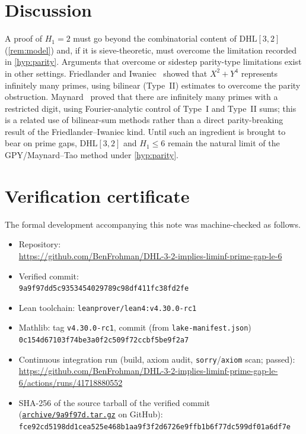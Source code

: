 \documentclass[11pt]{amsart}
\theoremstyle{plain}
\theoremstyle{definition}
\theoremstyle{remark}
\newcommand{\DHL}{\mathrm{DHL}}
\begin{document}
\section{Discussion}\label{sec:discussion}

A proof of $H_1=2$ must go beyond the combinatorial content of $\DHL[3,2]$ (\cref{rem:model}) and, if it is sieve-theoretic, must overcome the limitation recorded in \cref{hyp:parity}. Arguments that overcome or sidestep parity-type limitations exist in other settings. Friedlander and Iwaniec~\cite{FI} showed that $X^2+Y^4$ represents infinitely many primes, using bilinear (Type~II) estimates to overcome the parity obstruction. Maynard~\cite{Maynard19} proved that there are infinitely many primes with a restricted digit, using Fourier-analytic control of Type~I and Type~II sums; this is a related use of bilinear-sum methods rather than a direct parity-breaking result of the Friedlander--Iwaniec kind. Until such an ingredient is brought to bear on prime gaps, $\DHL[3,2]$ and $H_1\le6$ remain the natural limit of the GPY/Maynard--Tao method under \cref{hyp:parity}.


\appendix
\section{Verification certificate}\label{app:cert}

The formal development accompanying this note was machine-checked as follows.

{\raggedright
\begin{itemize}
\item Repository:\\ {\footnotesize\url{https://github.com/BenFrohman/DHL-3-2-implies-liminf-prime-gap-le-6}}
\item Verified commit:\\ {\footnotesize\texttt{9a9f97dd5c9353454029789c98df411fc38fd2fe}}
\item Lean toolchain: \texttt{leanprover/lean4:v4.30.0-rc1}
\item Mathlib: tag \texttt{v4.30.0-rc1}, commit (from \texttt{lake-manifest.json})\\ {\footnotesize\texttt{0c154d67103f74be3a0f2c509f72ccbf5be9f2a7}}
\item Continuous integration run (build, axiom audit, \texttt{sorry}/\texttt{axiom} scan; passed):\\ {\footnotesize\url{https://github.com/BenFrohman/DHL-3-2-implies-liminf-prime-gap-le-6/actions/runs/41718880552}}
\item SHA-256 of the source tarball of the verified commit
(\href{https://github.com/BenFrohman/DHL-3-2-implies-liminf-prime-gap-le-6/archive/9a9f97dd5c9353454029789c98df411fc38fd2fe.tar.gz}{\texttt{archive/9a9f97d.tar.gz}} on GitHub):\\
{\footnotesize\texttt{fce92cd5198dd1cea525e468b1aa9f3f2d6726e9ffb1b6f77dc599df01a6df7e}}
\end{itemize}\par}
\end{document}
